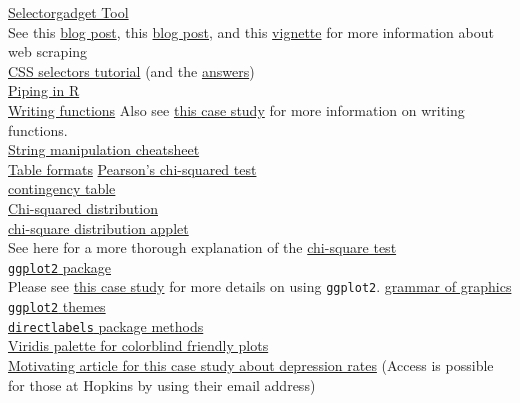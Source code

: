 \documentclass[
]{article}
\begin{document}
\href{https://cran.r-project.org/web/packages/rvest/vignettes/selectorgadget.html}{Selectorgadget
Tool}\\
See this
\href{http://research.libd.org/rstatsclub/post/introduction-to-scraping-and-wranging-tables-from-research-articles/\#.Xw878ZNKhQJ}{blog
post}, this
\href{http://blog.corynissen.com/2015/01/using-rvest-to-scrape-html-table.html}{blog
post}, and this
\href{https://rstudio-pubs-static.s3.amazonaws.com/266430_f3fd4660b2744751ab144aa130768a06.html}{vignette}
for more information about web scraping\\
\href{http://flukeout.github.io/\#}{CSS selectors tutorial} (and the
\href{https://gist.github.com/chrisman/fcb0a88459cd98239dbe6d2d200b02d1}{answers})\\
\href{https://cran.r-project.org/web/packages/magrittr/vignettes/magrittr.html}{Piping
in R}\\
\href{https://r4ds.had.co.nz/functions.html}{Writing functions} Also see
\href{https://opencasestudies.github.io/ocs-bloomberg-vaping-case-study/}{this
case study} for more information on writing functions.\\
\href{https://rstudio.com/resources/cheatsheets/}{String manipulation
cheatsheet}\\
\href{https://en.wikipedia.org/wiki/Wide_and_narrow_data}{Table formats}
\href{https://en.wikipedia.org/wiki/Pearson\%27s_chi-squared_test\#:~:text=Pearson's\%20chi\%2Dsquared\%20test\%20is,differs\%20from\%20a\%20theoretical\%20distribution.}{Pearson's
chi-squared test}\\
\href{https://en.wikipedia.org/wiki/Contingency_table}{contingency
table}\\
\href{https://en.wikipedia.org/wiki/Chi-squared_test\#/media/File:Chi-square_distributionCDF-English.png}{Chi-squared
distribution}\\
\href{http://homepage.divms.uiowa.edu/~mbognar/applets/chisq.html}{chi-square
distribution applet}\\
See here for a more thorough explanation of the
\href{https://www.ling.upenn.edu/~clight/chisquared.htm}{chi-square
test}\\
\href{http://ggplot2.tidyverse.org}{\texttt{ggplot2} package}\\
Please see
\href{https://opencasestudies.github.io/ocs-bp-co2-emissions/}{this case
study} for more details on using \texttt{ggplot2}.
\href{http://vita.had.co.nz/papers/layered-grammar.html}{grammar of
graphics}\\
\href{https://ggplot2.tidyverse.org/reference/ggtheme.html}{\texttt{ggplot2}
themes}\\
\href{http://directlabels.r-forge.r-project.org/docs/index.html}{\texttt{directlabels}
package methods}\\
\href{https://cran.r-project.org/web/packages/viridis/vignettes/intro-to-viridis.html}{Viridis
palette for colorblind friendly plots}\\
\href{https://pubmed.ncbi.nlm.nih.gov/30869927/}{Motivating article for
this case study about depression rates} (Access is possible for those at
Hopkins by using their email address)
\end{document}
